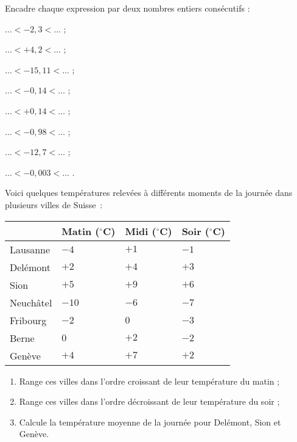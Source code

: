 \begin{exercice}
Encadre chaque expression par deux nombres entiers consécutifs :
\begin{colitemize}{2}
 \item $\ldots < - 2,3 < \ldots$ ;
 \item $\ldots < + 4,2 < \ldots$ ;
 \item $\ldots < - 15,11 < \ldots$ ;
 \item $\ldots < - 0,14 < \ldots$ ;
 \item $\ldots < + 0,14 < \ldots$ ;
 \item $\ldots < - 0,98 < \ldots$ ;
 \item $\ldots < - 12,7 < \ldots$ ;
 \item $\ldots < - 0,003 < \ldots$ .
 \end{colitemize}
\end{exercice}


\begin{exercice}
Voici quelques températures relevées à différents moments de la journée dans plusieurs villes de Suisse : \\[0.5em]
\begin{tabularx}{\linewidth}{|X|X|X|X|}
 \hline
 & Matin ($^\circ$C) & Midi ($^\circ$C) & Soir ($^\circ$C) \\\hline
 Lausanne & $- 4$ & $+ 1$ & $- 1$ \\\hline
 Delémont & $+ 2$ & $+ 4$ & $+ 3$ \\\hline
 Sion & $+ 5$ & $+ 9$ & $+ 6$ \\\hline
 Neuchâtel & $- 10$ & $- 6$ & $- 7$ \\\hline
 Fribourg & $- 2$ & $0$ & $- 3$ \\\hline
 Berne & $0$ & $+ 2$ & $- 2$ \\\hline
 Genève & $+ 4$ & $+ 7$ & $+ 2$ \\\hline
 \end{tabularx}
 \vspace{0.3cm}
\begin{enumerate}
 \item Range ces villes dans l'ordre croissant de  leur température du matin ;
 \item Range ces villes dans l'ordre décroissant de  leur température du soir ;
 \item Calcule la température moyenne de la journée pour Delémont, Sion et Genève.
 \end{enumerate}
\end{exercice}

